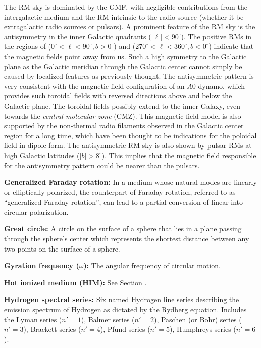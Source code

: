 \documentclass[a4paper,10pt]{article}
\begin{document}
{\noindent}The RM sky is dominated by the GMF, with negligible contributions from the intergalactic medium and the RM intrinsic to the radio source (whether it be extragalactic radio sources or pulsars). A prominent feature of the RM sky is the antisymmetry in the inner Galactic quadrants ($|\ell|<90^\circ$). The positive RMs in the regions of ($0^\circ<\ell<90^\circ, b>0^\circ$) and ($270^\circ<\ell<360^\circ, b<0^\circ$) indicate that the magnetic fields point away from us. Such a high symmetry to the Galactic plane as the Galactic meridian through the Galactic center cannot simply be caused by localized features as previously thought. The antisymmetric pattern is very consistent with the magnetic field configuration of an $A0$ dynamo, which provides such toroidal fields with reversed directions above and below the Galactic plane. The toroidal fields possibly extend to the inner Galaxy, even towards the \textit{central molecular zone} (CMZ). This magnetic field model is also supported by the non-thermal radio filaments observed in the Galactic center region for a long time, which have been thought to be indications for the poloidal field in dipole form. The antisymmetric RM sky is also shown by pulsar RMs at high Galactic latitudes ($|b|>8^\circ$). This implies that the magnetic field responsible for the antisymmetry pattern could be nearer than the pulsars. 

{\noindent}\textbf{Generalized Faraday rotation:} In a medium whose natural modes are linearly or elliptically polarized, the counterpart of Faraday rotation, referred to as ``generalized Faraday rotation'', can lead to a partial conversion of linear into circular polarization.

{\noindent}\textbf{Great circle:} A circle on the surface of a sphere that lies in a plane passing through the sphere's center which represents the shortest distance between any two points on the surface of a sphere.

{\noindent}\textbf{Gyration frequency ($\omega$):} The angular frequency of circular motion.

{\noindent}\textbf{Hot ionized medium (HIM):} See Section \label{sec:ism}. 

{\noindent}\textbf{Hydrogen spectral series:} Six named Hydrogen line series describing the emission spectrum of Hydrogen as dictated by the Rydberg equation. Includes the Lyman series ($n'=1$), Balmer series ($n'=2$), Paschen (or Bohr) series ($n'=3$), Brackett series ($n'=4$), Pfund series ($n'=5$), Humphreys series ($n'=6$).
\end{document}
